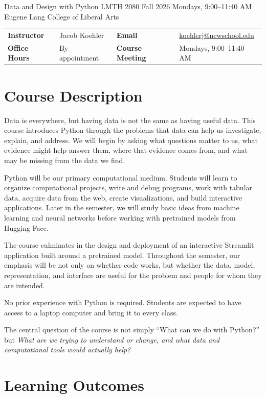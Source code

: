 \documentclass[11pt]{article}
\begin{document}
\courseheader
  {Data and Design with Python}
  {LMTH 2080}
  {Fall 2026 \textbullet{} Mondays, 9:00--11:40 AM}
  {Eugene Lang College of Liberal Arts}

\begin{tabularx}{\textwidth}{@{}>{\bfseries}l X >{\bfseries}l X@{}}
Instructor & Jacob Koehler &
Email & \href{mailto:koehlerj@newschool.edu}{koehlerj@newschool.edu} \\
Office Hours & By appointment &
Course Meeting & Mondays, 9:00--11:40 AM \\
\end{tabularx}

\section{Course Description}

Data is everywhere, but having data is not the same as having useful data.
This course introduces Python through the problems that data can help us
investigate, explain, and address. We will begin by asking what questions
matter to us, what evidence might help answer them, where that evidence comes
from, and what may be missing from the data we find.

Python will be our primary computational medium. Students will learn to
organize computational projects, write and debug programs, work with tabular
data, acquire data from the web, create visualizations, and build interactive
applications. Later in the semester, we will study basic ideas from machine
learning and neural networks before working with pretrained models from
Hugging Face.

The course culminates in the design and deployment of an interactive
Streamlit application built around a pretrained model. Throughout the
semester, our emphasis will be not only on whether code works, but whether the
data, model, representation, and interface are useful for the problem and
people for whom they are intended.

No prior experience with Python is required. Students are expected to have
access to a laptop computer and bring it to every class.

\begin{keyidea}
The central question of the course is not simply ``What can we do with
Python?'' but \emph{What are we trying to understand or change, and what data
and computational tools would actually help?}
\end{keyidea}

\section{Learning Outcomes}
\end{document}
